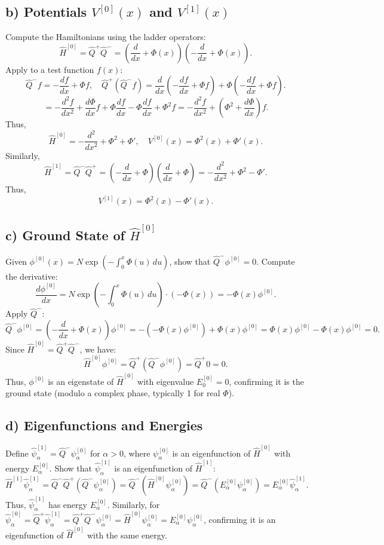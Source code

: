 \documentclass[a4paper,12pt]{article}
\begin{document}
\subsection*{b) Potentials \(V^{[0]}(x)\) and \(V^{[1]}(x)\)}

Compute the Hamiltonians using the ladder operators:
\[
\hat{H}^{[0]} = \hat{Q}^+ \hat{Q}^- = \left( \frac{d}{dx} + \Phi(x) \right) \left( -\frac{d}{dx} + \Phi(x) \right).
\]
Apply to a test function \(f(x)\):
\[
\hat{Q}^- f = -\frac{d f}{dx} + \Phi f, \quad \hat{Q}^+ (\hat{Q}^- f) = \frac{d}{dx} \left( -\frac{d f}{dx} + \Phi f \right) + \Phi \left( -\frac{d f}{dx} + \Phi f \right).
\]
\[
= -\frac{d^2 f}{dx^2} + \frac{d \Phi}{dx} f + \Phi \frac{d f}{dx} - \Phi \frac{d f}{dx} + \Phi^2 f = -\frac{d^2 f}{dx^2} + \left( \Phi^2 + \frac{d \Phi}{dx} \right) f.
\]
Thus,
\[
\hat{H}^{[0]} = -\frac{d^2}{dx^2} + \Phi^2 + \Phi', \quad V^{[0]}(x) = \Phi^2(x) + \Phi'(x).
\]
Similarly,
\[
\hat{H}^{[1]} = \hat{Q}^- \hat{Q}^+ = \left( -\frac{d}{dx} + \Phi \right) \left( \frac{d}{dx} + \Phi \right) = -\frac{d^2}{dx^2} + \Phi^2 - \Phi'.
\]
Thus,
\[
V^{[1]}(x) = \Phi^2(x) - \Phi'(x).
\]

\subsection*{c) Ground State of \(\hat{H}^{[0]}\)}

Given \(\phi^{[0]}(x) = N \exp \left( -\int_0^x \Phi(u) \, du \right)\), show that \(\hat{Q}^- \phi^{[0]} = 0\). Compute the derivative:
\[
\frac{d \phi^{[0]}}{dx} = N \exp \left( -\int_0^x \Phi(u) \, du \right) \cdot (-\Phi(x)) = -\Phi(x) \phi^{[0]}.
\]
Apply \(\hat{Q}^-\):
\[
\hat{Q}^- \phi^{[0]} = \left( -\frac{d}{dx} + \Phi(x) \right) \phi^{[0]} = -\left( -\Phi(x) \phi^{[0]} \right) + \Phi(x) \phi^{[0]} = \Phi(x) \phi^{[0]} - \Phi(x) \phi^{[0]} = 0.
\]
Since \(\hat{H}^{[0]} = \hat{Q}^+ \hat{Q}^-\), we have:
\[
\hat{H}^{[0]} \phi^{[0]} = \hat{Q}^+ (\hat{Q}^- \phi^{[0]}) = \hat{Q}^+ 0 = 0.
\]
Thus, \(\phi^{[0]}\) is an eigenstate of \(\hat{H}^{[0]}\) with eigenvalue \(E_0^{[0]} = 0\), confirming it is the ground state (modulo a complex phase, typically 1 for real \(\Phi\)).

\subsection*{d) Eigenfunctions and Energies}

Define \(\hat{\psi}_\alpha^{[1]} = \hat{Q}^- \psi_\alpha^{[0]}\) for \(\alpha > 0\), where \(\psi_\alpha^{[0]}\) is an eigenfunction of \(\hat{H}^{[0]}\) with energy \(E_\alpha^{[0]}\). Show that \(\hat{\psi}_\alpha^{[1]}\) is an eigenfunction of \(\hat{H}^{[1]}\):
\[
\hat{H}^{[1]} \hat{\psi}_\alpha^{[1]} = \hat{Q}^- \hat{Q}^+ (\hat{Q}^- \psi_\alpha^{[0]}) = \hat{Q}^- (\hat{H}^{[0]} \psi_\alpha^{[0]}) = \hat{Q}^- (E_\alpha^{[0]} \psi_\alpha^{[0]}) = E_\alpha^{[0]} \hat{\psi}_\alpha^{[1]}.
\]
Thus, \(\hat{\psi}_\alpha^{[1]}\) has energy \(E_\alpha^{[0]}\). Similarly, for \(\hat{\psi}_\alpha^{[0]} = \hat{Q}^+ \hat{\psi}_\alpha^{[1]} = \hat{Q}^+ \hat{Q}^- \psi_\alpha^{[0]} = \hat{H}^{[0]} \psi_\alpha^{[0]} = E_\alpha^{[0]} \psi_\alpha^{[0]}\), confirming it is an eigenfunction of \(\hat{H}^{[0]}\) with the same energy.
\end{document}
